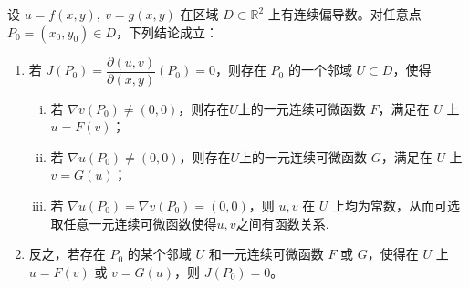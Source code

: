 \documentclass[../../main.tex]{subfiles}%
\begin{document}
\begin{theorem}\label{theorem:定理雅克比行列式为0的充要条件}
设 \(u=f(x,y),\ v=g(x,y)\) 在区域 \(D\subset\mathbb R^2\) 上有连续偏导数。对任意点 \(P_0=(x_0,y_0)\in D\)，下列结论成立：
\begin{enumerate}[(1)]
\item 若 \(J(P_0)=\dfrac{\partial(u,v)}{\partial(x,y)}(P_0)=0\)，则存在 \(P_0\) 的一个邻域 \(U\subset D\)，使得
\begin{enumerate}[(i)]
\item 若 \(\nabla v(P_0)\ne(0,0)\)，则存在\(U\)上的一元连续可微函数 \(F\)，满足在 \(U\) 上 \(u=F(v)\)；
\item 若 \(\nabla u(P_0)\ne(0,0)\)，则存在\(U\)上的一元连续可微函数 \(G\)，满足在 \(U\) 上 \(v=G(u)\)；
\item 若 \(\nabla u(P_0)=\nabla v(P_0)=(0,0)\)，则 \(u,v\) 在 \(U\) 上均为常数，从而可选取任意一元连续可微函数使得$u,v$之间有函数关系.
\end{enumerate}
\item 反之，若存在 \(P_0\) 的某个邻域 \(U\) 和一元连续可微函数 \(F\) 或 \(G\)，使得在 \(U\) 上 \(u=F(v)\) 或 \(v=G(u)\)，则 \(J(P_0)=0\)。
\end{enumerate}
\end{theorem}
\end{document}
